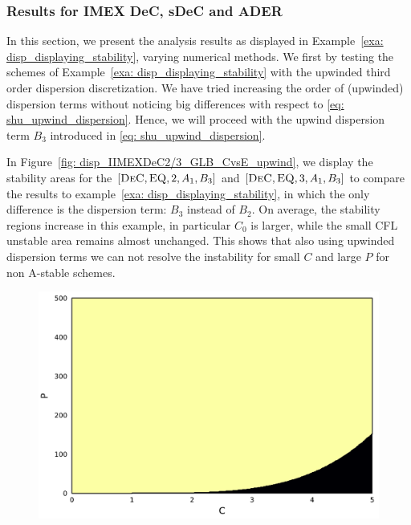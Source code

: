\subsubsection{Results for IMEX DeC, sDeC and ADER}
In this section, we present the analysis results as displayed in Example~\ref{exa: disp_displaying_stability}, varying numerical methods. 
We first by testing the schemes of Example~\ref{exa: disp_displaying_stability} with the upwinded third order dispersion discretization.
We have tried increasing the order of (upwinded) dispersion terms without noticing big differences with respect to \eqref{eq: shu_upwind_dispersion}. Hence, we will proceed with the upwind dispersion term $B_3$ introduced in \eqref{eq: shu_upwind_dispersion}.
\begin{example}\label{exa: disp_displaying_stability_upwind}
	In Figure~\ref{fig: disp_IIMEXDeC2/3_GLB_CvsE_upwind}, we display the stability areas for the $[\textsc{DeC}, \textsc{EQ},2,A_1,B_3]$ and $[\textsc{DeC}, \textsc{EQ},3, A_1,B_3]$ to compare the results to example~\ref{exa: disp_displaying_stability}, in which the only difference is the dispersion term: $B_3$ instead of $B_2$.
	On average, the stability regions increase in this example, in particular $C_0$ is larger, while the small CFL unstable area remains almost unchanged.
	This shows that also using upwinded dispersion terms we can not resolve the instability for small $C$ and large $P$ for non A-stable schemes.
	\begin{figure}[!h]
		\centering
		\begin{minipage}[t]{0.32\textwidth}
			\centering
			\includegraphics[width=\textwidth]{pdf/pdepics/disp/contourf_adv_disp_IMEXDeC_gaussLobatto_2_disp_Shu_adv_1_CP.pdf}

\end{minipage}
\end{figure}
\end{example}
